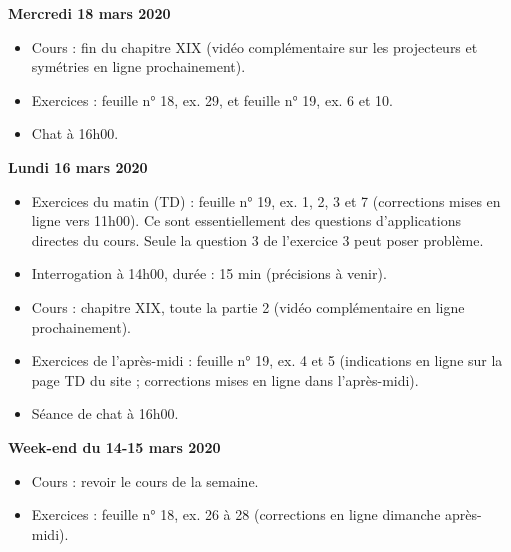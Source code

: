 \documentclass[12pt,a4paper]{article}
\begin{document}
\noindent\textbf{Mercredi 18 mars 2020}
\begin{itemize}
\item Cours : fin du chapitre XIX (vidéo complémentaire sur les projecteurs et symétries en ligne prochainement).
\item Exercices : feuille n° 18, ex. 29, et feuille n° 19, ex. 6 et 10.
\item Chat à 16h00.\vspace{.4cm}
\end{itemize}

\noindent\textbf{\bf Lundi 16 mars 2020}
\begin{itemize}
\item Exercices du matin (TD) : feuille n° 19, ex. 1, 2, 3 et 7 (corrections mises en ligne vers 11h00). Ce sont essentiellement des questions d'applications directes du cours. Seule la question 3 de l'exercice 3 peut poser problème.
\item Interrogation à 14h00, durée : 15 min (précisions à venir).
\item Cours : chapitre XIX, toute la partie 2 (vidéo complémentaire en ligne prochainement).
\item Exercices de l'après-midi : feuille n° 19, ex. 4 et 5 (indications en ligne sur la page TD du site ; corrections mises en ligne dans l'après-midi).
\item Séance de chat à 16h00.
\vspace{.4cm}
\end{itemize}

\noindent\textbf{Week-end du 14-15 mars 2020}
\begin{itemize}
\item Cours : revoir le cours de la semaine.
\item Exercices : feuille n° 18, ex. 26 à 28 (corrections en ligne dimanche après-midi).\vspace{.4cm}
\end{itemize}


\label{end}
\end{document}
